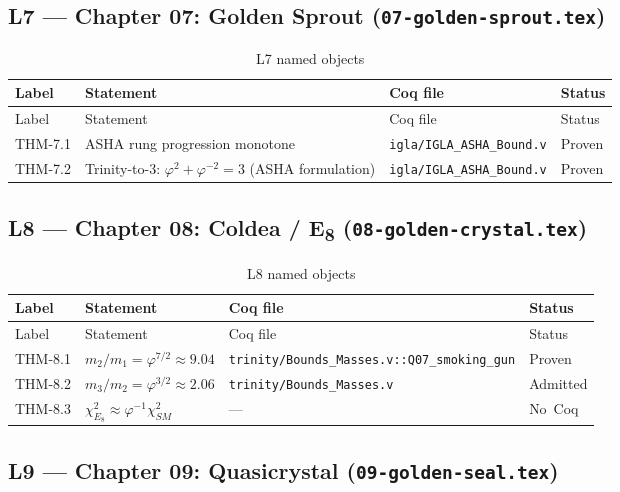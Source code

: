 \subsection{L7 — Chapter 07: Golden Sprout (\texttt{07-golden-sprout.tex})}
\label{sec:A-L7}

\begin{longtable}{lp{6cm}ll}
\toprule
Label & Statement & Coq file & Status \\
\midrule
\endfirsthead
\toprule
Label & Statement & Coq file & Status \\
\midrule
\endhead
\bottomrule
\endfoot
\bottomrule
\caption{L7 named objects}
\endlastfoot
THM-7.1 & ASHA rung progression monotone &
  \texttt{igla/IGLA\_ASHA\_Bound.v} & Proven \\
THM-7.2 & Trinity-to-3: $\varphi^{2}+\varphi^{-2}=3$ (ASHA formulation) &
  \texttt{igla/IGLA\_ASHA\_Bound.v} & Proven \\
\end{longtable}

\subsection{L8 — Chapter 08: Coldea / E\textsubscript{8}
  (\texttt{08-golden-crystal.tex})}
\label{sec:A-L8}

\begin{longtable}{lp{6cm}ll}
\toprule
Label & Statement & Coq file & Status \\
\midrule
\endfirsthead
\toprule
Label & Statement & Coq file & Status \\
\midrule
\endhead
\bottomrule
\endfoot
\bottomrule
\caption{L8 named objects}
\endlastfoot
THM-8.1 & $m_2/m_1 = \varphi^{7/2} \approx 9.04$ &
  \texttt{trinity/Bounds\_Masses.v::Q07\_smoking\_gun} & Proven \\
THM-8.2 & $m_3/m_2 = \varphi^{3/2} \approx 2.06$ &
  \texttt{trinity/Bounds\_Masses.v} & Admitted \\
THM-8.3 & $\chi^{2}_{E_8} \approx \varphi^{-1}\chi^{2}_{SM}$ & --- & No~Coq \\
\end{longtable}

\subsection{L9 — Chapter 09: Quasicrystal (\texttt{09-golden-seal.tex})}
\label{sec:A-L9}


